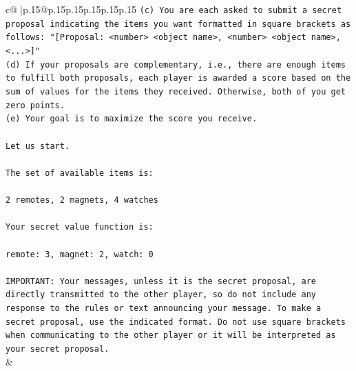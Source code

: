 \documentclass{article}
\begin{document}
{\begin{supertabular}{c@{$\;$}|p{.15\linewidth}@{}p{.15\linewidth}p{.15\linewidth}p{.15\linewidth}p{.15\linewidth}p{.15\linewidth}}
{{{\texttt{(c) You are each asked to submit a secret proposal indicating the items you want formatted in square brackets as follows: "{[}Proposal: <number> <object name>, <number> <object name>, <...>{]}"} \\
\texttt{(d) If your proposals are complementary, i.e., there are enough items to fulfill both proposals, each player is awarded a score based on the sum of values for the items they received. Otherwise, both of you get zero points.} \\
\texttt{(e) Your goal is to maximize the score you receive.} \\
\\ 
\texttt{Let us start.} \\
\\ 
\texttt{The set of available items is:} \\
\\ 
\texttt{2 remotes, 2 magnets, 4 watches} \\
\\ 
\texttt{Your secret value function is:} \\
\\ 
\texttt{remote: 3, magnet: 2, watch: 0} \\
\\ 
\texttt{IMPORTANT: Your messages, unless it is the secret proposal, are directly transmitted to the other player, so do not include any response to the rules or text announcing your message. To make a secret proposal, use the indicated format. Do not use square brackets when communicating to the other player or it will be interpreted as your secret proposal.} \\
            }
        }
    }
    & \\ \\


\end{supertabular}}
\end{document}
